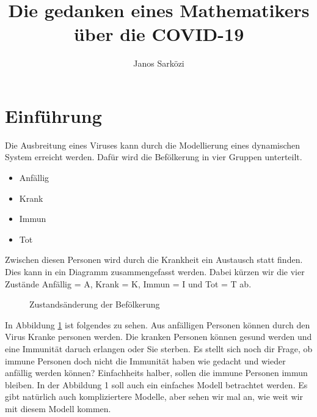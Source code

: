 \documentclass[11pt, a4paper]{article}
\begin{document}
\begin{titlepage}
    \title{Die gedanken eines Mathematikers über die COVID-19}
    \author{Janos Sarközi}
    \maketitle
\end{titlepage}

\section{Einführung}

Die Ausbreitung eines Viruses kann durch die Modellierung eines dynamischen System erreicht
werden. Dafür wird die Befölkerung in vier Gruppen unterteilt.

\begin{itemize}[itemsep=0pt]
    \item Anfällig
    \item Krank
    \item Immun
    \item Tot
\end{itemize}

Zwischen diesen Personen wird durch die Krankheit ein Austausch statt finden. Dies kann
in ein Diagramm zusammengefasst werden. Dabei kürzen wir die vier Zustände Anfällig = A,
Krank = K, Immun = I und Tot = T ab.

\begin{figure}[h]
\centering
{}
\caption{Zustandsänderung der Befölkerung}
\label{fig:sir}
\end{figure}

In Abbildung \ref{fig:sir} ist folgendes zu sehen. Aus anfälligen Personen können durch den Virus Kranke personen werden. Die kranken Personen können gesund werden und eine Immunität daruch
erlangen oder Sie sterben. Es stellt sich noch dir Frage, ob immune Personen doch nicht die
Immunität haben wie gedacht und wieder anfällig werden können? Einfachheits halber, sollen
die immune Personen immun bleiben. In der Abbildung 1 soll auch ein einfaches Modell
betrachtet werden. Es gibt natürlich auch kompliziertere Modelle, aber sehen wir mal an,
wie weit wir mit diesem Modell kommen.
\end{document}
